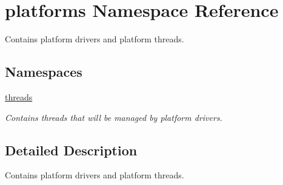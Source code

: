 \hypertarget{namespaceplatforms}{}\section{platforms Namespace Reference}
\label{namespaceplatforms}


Contains platform drivers and platform threads.  


\subsection*{Namespaces}
\begin{DoxyCompactItemize}
\item 
 \hyperlink{namespaceplatforms_1_1threads}{threads}
\begin{DoxyCompactList}\small\item\em Contains threads that will be managed by platform drivers. \end{DoxyCompactList}\end{DoxyCompactItemize}


\subsection{Detailed Description}
Contains platform drivers and platform threads. 